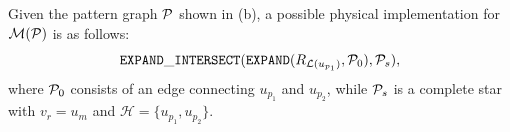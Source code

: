 \begin{example}
    Given the pattern graph $\mathcal{P}$ shown in (b), a possible physical implementation for $\mathcal{M}(\mathcal{P})$ is as follows:
    \begin{equation*}
        \texttt{EXPAND}\_\texttt{INTERSECT}({\texttt{EXPAND}}({R_{\mathcal{L}(u_{p_1})}}, \mathcal{P}_{0}), \mathcal{P}_{s}),
    \end{equation*}
    where $\mathcal{P}_{0}$ consists of an edge connecting $u_{p_1}$ and $u_{p_2}$, while $\mathcal{P}_{s}$ is a complete star with $v_r = u_m$ and $\mathcal{H} = \{u_{p_1}, u_{p_2}\}$.
\end{example}
